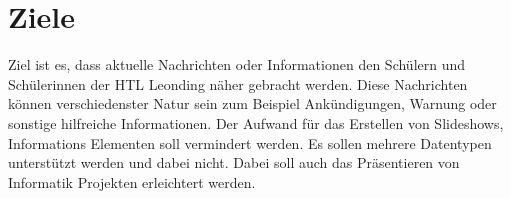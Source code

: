 \section{Ziele}
Ziel ist es, dass aktuelle Nachrichten oder Informationen den Schülern und Schülerinnen der HTL Leonding näher gebracht werden. Diese Nachrichten können verschiedenster Natur sein zum Beispiel Ankündigungen, Warnung oder sonstige hilfreiche Informationen.
Der Aufwand für das Erstellen von Slideshows, Informations Elementen soll vermindert werden. Es sollen mehrere Datentypen unterstützt werden und dabei nicht. Dabei soll auch das Präsentieren von Informatik Projekten erleichtert werden.


